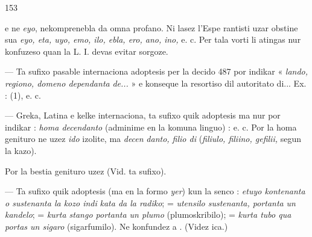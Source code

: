 \begin{VUpage}[157]{153}

\VUcontinue
e ne \textit{eyo}, nekomprenebla da omna profano. Ni lasez l'Espe\cc
rantisti uzar obstine sua \textit{eyo, eta, uyo, emo, ilo, ebla, ero, ano,}\nl
\textit{ino,} e. c. Per tala vorti li atingas nur konfuzeso quan la L. I.\nl
devas evitar sorgoze.

 --- Ta sufixo pasable internaciona adoptesis per la\nl
decido 487 por indikar « \textit{lando, regiono, domeno dependanta}\nl
\textit{de...} » e konseque la resortiso dil autoritato di... Ex. : \cc
{} (1),  e. c.\parplein

 --- Greka, Latina e kelke internaciona, ta sufixo quik\nl
adoptesis ma nur por indikar : \textit{homa decendanto} (adminime\nl
en la komuna linguo) : \cc
{} e. c. Por la homa genituro ne uzez \textit{ido} izolite, ma \textit{decen}\cc
\textit{danto, filio di} (\textit{filiulo, filiino, gefilii,} segun la kazo).

Por la bestia genituro uzez  (Vid. ta sufixo).

 --- Ta sufixo quik adoptesis (ma en la formo \textit{yer})\nl
kun la senco\VUcorrige{)}{} : \textit{etuyo kontenanta o sustenanta la kozo indi}\cc
\textit{kata da la radiko};  = \textit{utensilo sustenanta, portanta}\nl
\textit{un kandelo};  = \textit{kurta stango portanta un plumo}\nl
(plumoskribilo);  = \textit{kurta tubo qua portas un sigaro}\nl
(sigarfumilo). Ne konfundez  a . (Videz ica.)


\end{VUpage}
